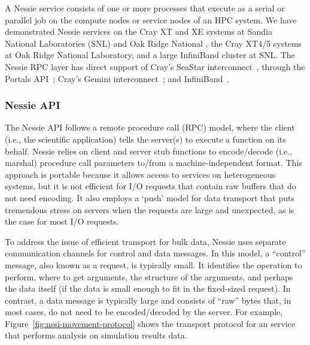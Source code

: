 A Nessie service consists of one or more processes that execute as a serial
or parallel job on the compute nodes or service nodes of an HPC system. We have
demonstrated Nessie services on the Cray XT and XE systems at Sandia National
Laboratories (SNL) and Oak Ridge National , the Cray XT4/5 systems at Oak Ridge National Laboratory,
and a large InfiniBand
cluster at SNL. The Nessie RPC layer has direct support of Cray's SeaStar
interconnect~\cite{brightwell:2006:seastar}, through the Portals
API~\cite{brightwell:2002:portals3}; Cray's Gemini
interconnect~\cite{alverson:2010:gemini}; and
InfiniBand~\cite{infiniband:specification}.  

\subsubsection{Nessie API}

The Nessie API follows a remote procedure call (RPC) model, where the client
(i.e., the scientific application) tells the server(s) to execute a function on
its behalf.  Nessie relies on client and server stub functions to encode/decode
(i.e., marshal) procedure call parameters to/from a machine-independent format.
This approach is portable because it allows access to services on heterogeneous
systems, but it is not efficient for I/O requests that contain raw buffers that
do not need encoding. It also employs a `push' model for data transport that
puts tremendous stress on servers when the requests are large and unexpected,
as is the case for most I/O requests.


To address the issue of efficient transport for bulk data, Nessie uses separate
communication channels for control and data messages. In this model, a ``control''
message, also known as a request, is typically small. It identifies the
operation to perform, where to get arguments, the structure of the arguments,
and perhaps the data itself (if the data is small enough to fit in the
fixed-sized request).  In contrast, a data message is typically large and
consists of ``raw'' bytes that, in most cases, do not need to be
encoded/decoded by the server. For example,
Figure~\ref{fig:nssi-movement-protocol} shows the transport protocol for an
\intransit service that performs analysis on simulation results data.

